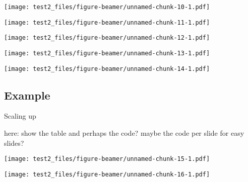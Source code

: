 \documentclass[
  ignorenonframetext,
]{beamer}
\begin{document}
\begin{frame}

\texttt{[image: test2\_files/figure-beamer/unnamed-chunk-10-1.pdf]}

\end{frame}

\begin{frame}

\texttt{[image: test2\_files/figure-beamer/unnamed-chunk-11-1.pdf]}

\end{frame}

\begin{frame}

\texttt{[image: test2\_files/figure-beamer/unnamed-chunk-12-1.pdf]}

\end{frame}

\begin{frame}

\texttt{[image: test2\_files/figure-beamer/unnamed-chunk-13-1.pdf]}

\end{frame}

\begin{frame}

\texttt{[image: test2\_files/figure-beamer/unnamed-chunk-14-1.pdf]}

\end{frame}

\hypertarget{example}{%
\subsection{Example}\label{example}}

\begin{frame}{Scaling up}
\protect\hypertarget{scaling-up}{}

here: show the table and perhaps the code? maybe the code per slide for
easy slides?

\end{frame}

\begin{frame}

\texttt{[image: test2\_files/figure-beamer/unnamed-chunk-15-1.pdf]}

\end{frame}

\begin{frame}

\texttt{[image: test2\_files/figure-beamer/unnamed-chunk-16-1.pdf]}

\end{frame}
\end{document}
